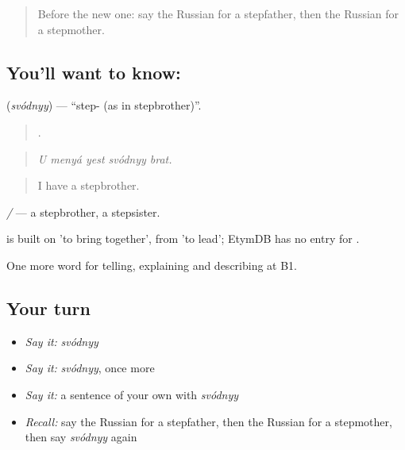 \label{lesson:RU-C492-svodnyy}



\begin{quote}
Before the new one: say the Russian for a stepfather, then the Russian for a stepmother.
\end{quote}

\subsection*{You'll want to know: }
\textbf{} (\emph{svódnyy}) — \textquotedblleft{}step- (as in stepbrother)\textquotedblright{}.

\begin{quote}
    .
\end{quote}

\begin{quote}
\emph{U menyá yest svódnyy brat.}
\end{quote}

\begin{quote}
I have a stepbrother.
\end{quote}

\emph{  /  } — a stepbrother, a stepsister.

\begin{cousinweb}
\emph{} is built on \emph{} 'to bring together', from \emph{} 'to lead'; EtymDB has no entry for \emph{}.
\end{cousinweb}

\begin{grammarlens}[title={What you've built}]
One more word for telling, explaining and describing at B1.
\end{grammarlens}

\subsection*{Your turn}
\begin{itemize}
\raggedright
  \item \emph{Say it:} \emph{svódnyy}
  \item \emph{Say it:} \emph{svódnyy}, once more
  \item \emph{Say it:} a sentence of your own with \emph{svódnyy}
  \item \emph{Recall:} say the Russian for a stepfather, then the Russian for a stepmother, then say \emph{svódnyy} again
\end{itemize}

